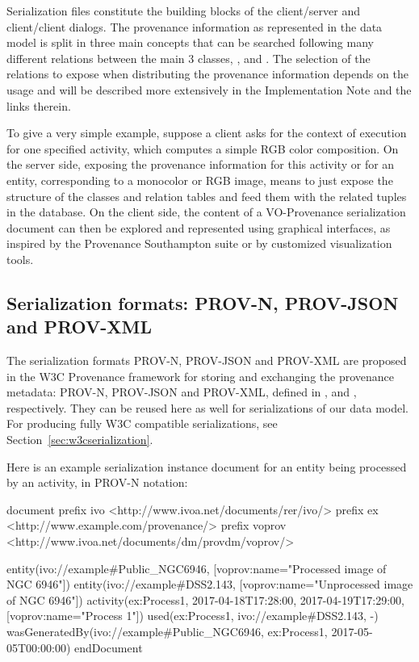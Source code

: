 Serialization files constitute the building blocks of the client/server and client/client dialogs.
The provenance information as represented in the data model is split in three main concepts that can be searched following many different relations between the main 3 classes, ,  and .
The selection of the relations to expose when distributing the provenance information depends on the usage and will be described more extensively in the Implementation Note \citep{std:ProvenanceImplementationNote} and the links therein.

To give a very simple example, suppose a client asks for the context of execution for one specified activity, which computes a simple RGB color composition. 
On the server side, exposing the provenance information for this activity or for an entity, corresponding to a monocolor or RGB image, means to just expose the structure of the classes and relation tables and feed them with the related tuples in the database.
On the client side, the content of a VO-Provenance serialization document can then be explored and represented using graphical interfaces, as inspired by the Provenance Southampton suite or by customized visualization tools.

\subsection{Serialization formats: PROV-N, PROV-JSON and PROV-XML} %
The serialization formats {PROV-N}, {PROV-JSON} and {PROV-XML} are proposed 
in the W3C Provenance framework for storing and exchanging the provenance metadata: {PROV-N}, {PROV-JSON} and {PROV-XML}, defined in \cite{std:PROV-N}, \cite{std:PROV-JSON} and \cite{std:PROV-XML}, respectively. 
They can be reused here as well for serializations of our data model. For producing fully W3C compatible serializations, see Section~\ref{sec:w3cserialization}.


Here is an example serialization instance document for an entity being processed by an activity, in PROV-N notation:

\begin{verbnobox}[\scriptsize]

document
  prefix ivo <http://www.ivoa.net/documents/rer/ivo/>
  prefix ex <http://www.example.com/provenance/>
  prefix voprov <http://www.ivoa.net/documents/dm/provdm/voprov/>

  entity(ivo://example#Public_NGC6946, [voprov:name="Processed image of NGC 6946"])
  entity(ivo://example#DSS2.143, [voprov:name="Unprocessed image of NGC 6946"])
  activity(ex:Process1, 2017-04-18T17:28:00, 2017-04-19T17:29:00, [voprov:name="Process 1"])
  used(ex:Process1, ivo://example#DSS2.143, -)
  wasGeneratedBy(ivo://example#Public_NGC6946, ex:Process1, 2017-05-05T00:00:00)
endDocument

\end{verbnobox}

